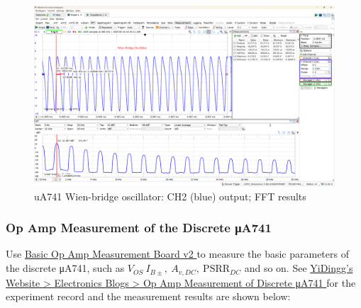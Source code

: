 \documentclass[UTF8]{article}
\begin{document}
\begin{figure}[H]\centering
    \includegraphics[width=\columnwidth]{LCE-06-07-运放设计/assets/uA741/test/wien 2.png}
    \caption{uA741 Wien-bridge oscillator: CH2 (blue) output; FFT results}
\end{figure}

\subsubsection{Op Amp Measurement of the Discrete μA741}

Use %
\href{https://yidingg.github.io/YiDingg/\#/ElectronicDesigns/Basic\%20Op\%20Amp\%20Measurement\%20Board\%20v2
}{ %
Basic Op Amp Measurement Board v2
} to measure the basic parameters of the discrete μA741, such as $V_{OS}\ I_{B\pm},\ A_{v,DC},\ \mathrm{PSRR}_{DC}$ and so on.
See %
\href{https://yidingg.github.io/YiDingg/#/Electronics/Op\%20Amp\%20Measurement\%20of\%20Discrete\%20uA741
}{ %
YiDingg's Website > Electronics Blogs > Op Amp Measurement of Discrete μA741
}
for the experiment record and the measurement results are shown below:
\end{document}
